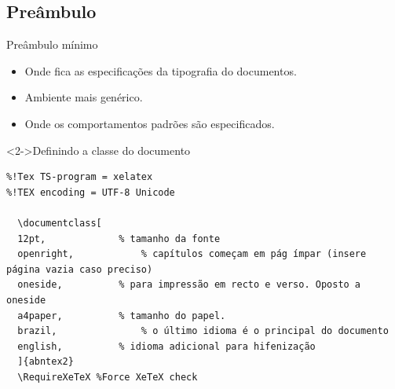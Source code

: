 \documentclass[bigger]{beamer}
\begin{document}
\subsection{Preâmbulo}
\label{sec:org7f843f4}
\begin{frame}[label={sec:orgde029e9},fragile]{Preâmbulo mínimo}
 \begin{itemize}
\item Onde fica as especificações da tipografia do documentos.
\item Ambiente mais genérico.
\item Onde os comportamentos padrões são especificados.
\end{itemize}
\begin{block}<2->{Definindo a classe do documento}
\begin{verbatim}
%!Tex TS-program = xelatex
%!TEX encoding = UTF-8 Unicode

  \documentclass[
  12pt,				% tamanho da fonte
  openright,			% capítulos começam em pág ímpar (insere página vazia caso preciso)
  oneside,			% para impressão em recto e verso. Oposto a oneside
  a4paper,			% tamanho do papel.
  brazil,				% o último idioma é o principal do documento
  english,			% idioma adicional para hifenização
  ]{abntex2}
  \RequireXeTeX %Force XeTeX check
\end{verbatim}
\end{block}
\end{frame}
\end{document}
